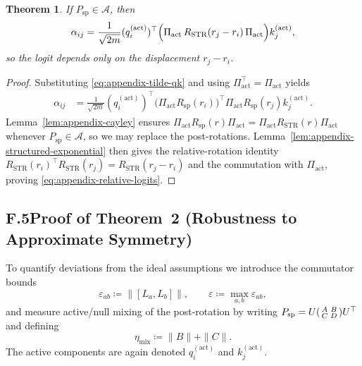 \documentclass[11pt]{article}
\newtheorem{theorem}{Theorem}
\begin{document}
\begin{theorem}\label{thm:appendix-relative-logits}
If $P_{\mathrm{sp}}\in\mathcal{A}$, then
\begin{equation}
  \alpha_{ij}
  = \frac{1}{\sqrt{2m}}
    (q_i^{(\mathrm{act})})^\top
    \Bigl(\Pi_{\mathrm{act}}\,R_{\mathrm{STR}}(r_j - r_i)\,\Pi_{\mathrm{act}}\Bigr)
    k_j^{(\mathrm{act})},
  \label{eq:appendix-relative-logits}
\end{equation}
so the logit depends only on the displacement $r_j - r_i$.
\end{theorem}

\begin{proof}
Substituting \eqref{eq:appendix-tilde-qk} and using $\Pi_{\mathrm{act}}^\top = \Pi_{\mathrm{act}}$ yields
\begin{align}
  \alpha_{ij}
  &= \frac{1}{\sqrt{2m}}
     (q_i^{(\mathrm{act})})^\top
     \bigl(\Pi_{\mathrm{act}} R_{\mathrm{sp}}(r_i)\bigr)^\top
     \Pi_{\mathrm{act}} R_{\mathrm{sp}}(r_j)
     k_j^{(\mathrm{act})}.
\end{align}
Lemma~\ref{lem:appendix-cayley} ensures $\Pi_{\mathrm{act}} R_{\mathrm{sp}}(r) \Pi_{\mathrm{act}} =
\Pi_{\mathrm{act}} R_{\mathrm{STR}}(r) \Pi_{\mathrm{act}}$ whenever $P_{\mathrm{sp}}\in\mathcal{A}$, so we may replace
the post-rotations.  Lemma~\ref{lem:appendix-structured-exponential} then gives the relative-rotation identity
$R_{\mathrm{STR}}(r_i)^\top R_{\mathrm{STR}}(r_j) = R_{\mathrm{STR}}(r_j - r_i)$ and the commutation
with $\Pi_{\mathrm{act}}$, proving \eqref{eq:appendix-relative-logits}.
\end{proof}

\subsection*{F.5\quad Proof of Theorem~2 (Robustness to Approximate Symmetry)}

To quantify deviations from the ideal assumptions we introduce the commutator bounds
\begin{equation}
  \varepsilon_{ab} \coloneqq \bigl\|[L_a,L_b]\bigr\|,
  \qquad
  \varepsilon \coloneqq \max_{a,b} \varepsilon_{ab},
  \label{eq:appendix-epsilon}
\end{equation}
and measure active/null mixing of the post-rotation by writing
$P_{\mathrm{sp}} = U \begin{psmallmatrix} A & B\\ C & D \end{psmallmatrix} U^\top$ and defining
\begin{equation}
  \eta_{\mathrm{mix}} \coloneqq \|B\| + \|C\|.
  \label{eq:appendix-eta-mix}
\end{equation}
The active components are again denoted $q_i^{(\mathrm{act})}$ and $k_j^{(\mathrm{act})}$.
\end{document}
